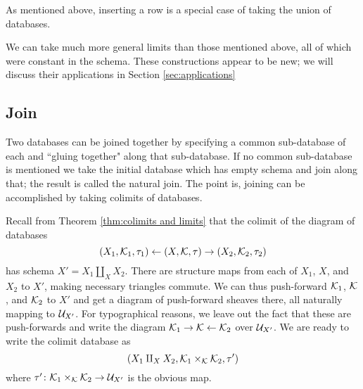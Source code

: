 \documentclass{amsart}
\begin{document}
As mentioned above, inserting a row is a special case of taking the union of databases.

We can take much more general limits than those mentioned above, all of which were constant in the schema.  These constructions appear to be new; we will discuss their applications in Section \ref{sec:applications} 

\subsection{Join}\label{subsec:join}

Two databases can be joined together by specifying a common sub-database of each and ``gluing together" along that sub-database.  If no common sub-database is mentioned we take the initial database which has empty schema and join along that; the result is called the natural join.  The point is, joining can be accomplished by taking colimits of databases.

Recall from Theorem \ref{thm:colimits and limits} that the colimit of the diagram of databases $$(X_1,\mathcal{K}_1,\tau_1)\leftarrow(X,\mathcal{K},\tau)\rightarrow(X_2,\mathcal{K}_2,\tau_2)$$ has schema $X'=X_1\amalg_XX_2$.  There are structure maps from each of $X_1$, $X$, and $X_2$ to $X'$, making necessary triangles commute.  We can thus push-forward $\mathcal{K}_1$, $\mathcal{K}$, and $\mathcal{K}_2$ to $X'$ and get a diagram of push-forward sheaves there, all naturally mapping to $\mathcal{U}_{X'}$.  For typographical reasons, we leave out the fact that these are push-forwards and write the diagram $\mathcal{K}_1\rightarrow\mathcal{K}\leftarrow\mathcal{K}_2$ over $\mathcal{U}_{X'}$.  We are ready to write the colimit database as $$(X_1\amalg_XX_2,\mathcal{K}_1\times_\mathcal{K}\mathcal{K}_2,\tau')$$ where $\tau'\colon\mathcal{K}_1\times_\mathcal{K}\mathcal{K}_2\rightarrow\mathcal{U}_{X'}$ is the obvious map.
\end{document}
